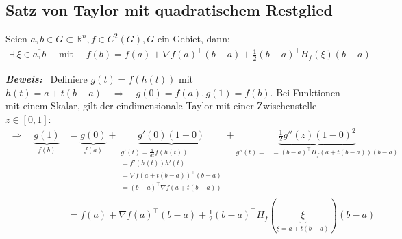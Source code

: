 \documentclass[11pt,a4paper]{book}
\newcommand {\Rn}	{\mathbb{R}^n}
\newcommand{\1}    	{\mathbbm{1}}
\newcommand{\mitt}	{\textrm{ mit }}
\newcommand{\Beweis}[1][Beweis]
{\begin{mdframed}[backgroundcolor=gray!10,linewidth=0pt]\noindent\textit{\textbf{{#1}:}}~}
\newcommand{\QED}	{\end{mdframed}}
\begin{document}
\subsection{Satz von Taylor mit quadratischem Restglied}
Seien \(a,b \in G \subset \Rn, f \in C^2(G), G\) ein Gebiet, dann:
\begin{align*}
	\exists~ \xi \in \overline{a,b} \quad\mitt\quad f(b) = f(a) + \nabla f(a)^\top (b-a) + \frac{1}{2} (b-a)^\top H_f(\xi)(b-a)
\end{align*}

\Beweis
Definiere \(g(t) = f(h(t))\) mit \(h(t) = a + t(b-a) \quad\Rightarrow\quad g(0) = f(a), g(1) = f(b)\). Bei Funktionen mit einem Skalar, gilt der eindimensionale Taylor mit einer Zwischenstelle \(z \in [0,1]\):
\begin{align*}
	\Rightarrow \quad \underbrace{g(1)}_{f(b)} &= \underbrace{g(0)}_{f(a)} + 
	\underbrace{g'(0)(1-0)}_{\substack{
		g'(t) = \frac{d}{dt} f(h(t)) \\
		= f'(h(t))h'(t) \\
		= \nabla f(a + t(b-a))^\top (b-a) \\
		= (b-a)^\top \nabla f(a + t(b-a)) 
	}} + 
	\underbrace{\frac{1}{2} g''(z)(1-0)^2}_{
		g''(t) = ... = (b-a)^\top H_f(a + t(b-a))(b-a)
	} \\
	&= f(a) + \nabla f(a)^\top (b-a) + \frac{1}{2} (b-a)^\top H_f(\underbrace{\xi}_{\xi = a + t(b-a)})(b-a)
\end{align*}
\QED
\end{document}
